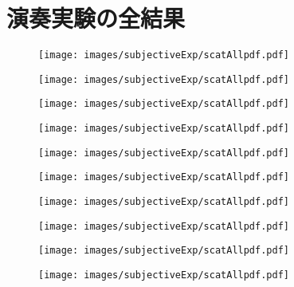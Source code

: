 \documentclass[11pt,a4j,dvipdfmx]{jreport}
\begin{document}
\chapter{演奏実験の全結果}

  \begin{figure}[H]
    \centering
    \texttt{[image: images/subjectiveExp/scatAllpdf.pdf]}
  \end{figure}

  \begin{figure}[H]
    \begin{minipage}[b]{0.5\linewidth}
      \centering
      \texttt{[image: images/subjectiveExp/scatAllpdf.pdf]}
    \end{minipage}%
    \begin{minipage}[b]{0.5\linewidth}
      \centering
      \texttt{[image: images/subjectiveExp/scatAllpdf.pdf]}
    \end{minipage}

    \begin{minipage}[b]{0.5\linewidth}
      \centering
      \texttt{[image: images/subjectiveExp/scatAllpdf.pdf]}
    \end{minipage}%
    \begin{minipage}[b]{0.5\linewidth}
      \centering
      \texttt{[image: images/subjectiveExp/scatAllpdf.pdf]}
    \end{minipage}
  \end{figure}

  \clearpage


  \begin{figure}[H]
    \centering
    \texttt{[image: images/subjectiveExp/scatAllpdf.pdf]}
  \end{figure}

  \begin{figure}[H]
    \begin{minipage}[b]{0.5\linewidth}
      \centering
      \texttt{[image: images/subjectiveExp/scatAllpdf.pdf]}
    \end{minipage}%
    \begin{minipage}[b]{0.5\linewidth}
      \centering
      \texttt{[image: images/subjectiveExp/scatAllpdf.pdf]}
    \end{minipage}

    \begin{minipage}[b]{0.5\linewidth}
      \centering
      \texttt{[image: images/subjectiveExp/scatAllpdf.pdf]}
    \end{minipage}%
    \begin{minipage}[b]{0.5\linewidth}
      \centering
      \texttt{[image: images/subjectiveExp/scatAllpdf.pdf]}
    \end{minipage}
  \end{figure}
\end{document}
